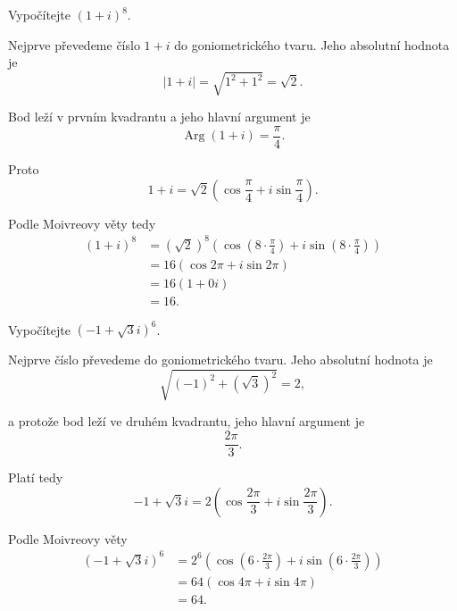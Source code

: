 \documentclass[12pt,a4paper]{article}
\begin{document}
\begin{examplebox}
    Vypočítejte $(1+i)^8$.

    Nejprve převedeme číslo $1+i$ do goniometrického tvaru.
    Jeho absolutní hodnota je
    \[
        |1+i| = \sqrt{1^2+1^2} = \sqrt{2}.
    \]

    Bod leží v prvním kvadrantu a jeho hlavní argument je
    \[
        \operatorname{Arg}(1+i) = \frac{\pi}{4}.
    \]

    Proto
    \[
        1+i = \sqrt{2}  \left(
                            \cos\frac{\pi}{4} + i\sin\frac{\pi}{4}
                        \right).
    \]

    Podle Moivreovy věty tedy
    \begin{align*}
        (1+i)^8 &= (\sqrt{2})^8 \left(
                                    \cos\left(8\cdot\frac{\pi}{4}\right)
                                    +
                                    i\sin\left(8\cdot\frac{\pi}{4}\right)
                                \right)\\
                &= 16   \left(
                            \cos2\pi + i\sin2\pi
                        \right)\\
                &= 16(1+0i)\\
                &= 16.
    \end{align*}
\end{examplebox}


\begin{examplebox}
    Vypočítejte $(-1+\sqrt{3}i)^6$.

    Nejprve číslo převedeme do goniometrického tvaru. 
    Jeho absolutní hodnota je
    \[
        \sqrt{(-1)^2+(\sqrt{3})^2}=2,
    \]

    a protože bod leží ve druhém kvadrantu, jeho hlavní argument je
    \[
        \frac{2\pi}{3}.
    \]

    Platí tedy
    \[
        -1+\sqrt{3}i = 2    \left(
                                \cos\frac{2\pi}{3} + i\sin\frac{2\pi}{3}
                            \right).
    \]

    Podle Moivreovy věty
    \begin{align*}
        (-1+\sqrt{3}i)^6    &= 2^6  \left(
                                        \cos\left(6\cdot\frac{2\pi}{3}\right)
                                        +
                                        i\sin\left(6\cdot\frac{2\pi}{3}\right)
                                    \right)\\
                            &= 64 \left(\cos4\pi + i\sin4\pi\right)\\
                            &=64.
    \end{align*}
\end{examplebox}
\end{document}
